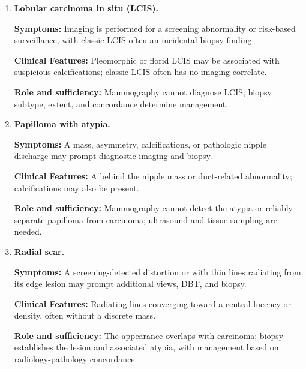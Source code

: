 \begin{enumerate}[leftmargin=*,itemsep=0.45em,topsep=0.4em]
\item \textbf{Lobular carcinoma in situ (LCIS).}\par\noindent\textbf{Symptoms:} Imaging is performed for a screening abnormality or risk-based surveillance, with classic LCIS often an incidental biopsy finding.\par\noindent\textbf{Clinical Features:} Pleomorphic or florid LCIS may be associated with suspicious calcifications; classic LCIS often has no imaging correlate.\par\noindent\textbf{Role and sufficiency:} Mammography cannot diagnose LCIS; biopsy subtype, extent, and concordance determine management.
\item \textbf{Papilloma with atypia.}\par\noindent\textbf{Symptoms:} A mass, asymmetry, calcifications, or pathologic nipple discharge may prompt diagnostic imaging and biopsy.\par\noindent\textbf{Clinical Features:} A behind the nipple mass or duct-related abnormality; calcifications may also be present.\par\noindent\textbf{Role and sufficiency:} Mammography cannot detect the atypia or reliably separate papilloma from carcinoma; ultrasound and tissue sampling are needed.
\item \textbf{Radial scar.}\par\noindent\textbf{Symptoms:} A screening-detected distortion or with thin lines radiating from its edge lesion may prompt additional views, DBT, and biopsy.\par\noindent\textbf{Clinical Features:} Radiating lines converging toward a central lucency or density, often without a discrete mass.\par\noindent\textbf{Role and sufficiency:} The appearance overlaps with carcinoma; biopsy establishes the lesion and associated atypia, with management based on radiology-pathology concordance.
\end{enumerate}

